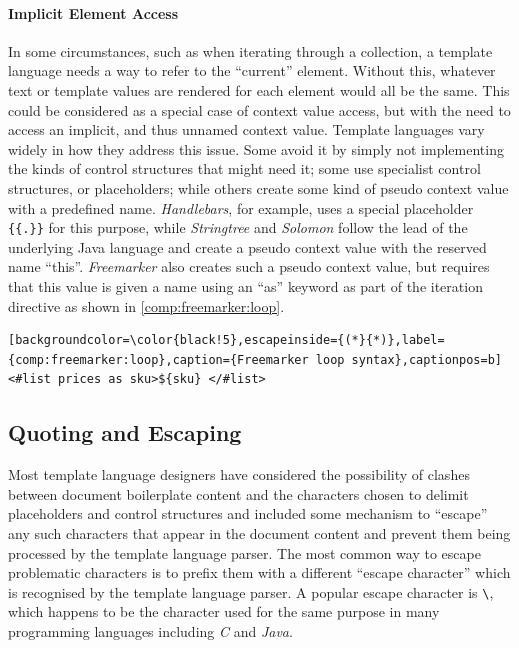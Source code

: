 \paragraph{Implicit Element Access}
In some circumstances, such as when iterating through a collection, a \gls{template language} needs a way to refer to the \enquote{current} element. Without this, whatever text or template values are rendered for each element would all be the same. This could be considered as a special case of context value access, but with the need to access an implicit, and thus unnamed context value. Template languages vary widely in how they address this issue. Some avoid it by simply not implementing the kinds of control structures that might need it; some use specialist control structures, or placeholders; while others create some kind of pseudo context value with a predefined name. \emph{Handlebars}, for example, uses a special placeholder \verb!{{.}}! for this purpose, while \emph{Stringtree} and \emph{Solomon} follow the lead of the underlying Java language and create a pseudo context value with the reserved name \enquote{this}. \emph{Freemarker} also creates such a pseudo context value, but requires that this value is given a name using an \enquote{as} keyword as part of the iteration directive as shown in \autoref{comp:freemarker:loop}.

\begin{lstlisting}[backgroundcolor=\color{black!5},escapeinside={(*}{*)},label={comp:freemarker:loop},caption={Freemarker loop syntax},captionpos=b]
<#list prices as sku>${sku} </#list>
\end{lstlisting}

\subsection{Quoting and Escaping}
\label{comp:quoting}

Most \gls{template language} designers have considered the possibility of clashes between document boilerplate content and the characters chosen to delimit placeholders and control structures and included some mechanism to \enquote{escape} any such characters that appear in the document content and prevent them being processed by the \gls{template language} parser. The most common way to escape problematic characters is to prefix them with a different \enquote{escape character} which is recognised by the \gls{template language} parser. A popular escape character is \verb!\!, which happens to be the character used for the same purpose in many \gls{programming language}s including \emph{C} and \emph{Java}.

